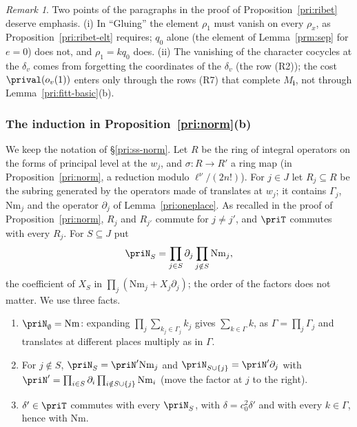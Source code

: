 \documentclass[10pt]{amsart}
\theoremstyle{definition}
\theoremstyle{remark}
\newtheorem{remark}[theorem]{Remark}
\begin{document}
\begin{remark}\label{prm:rem-chars}
Two points of the paragraphs in the proof of Proposition~\ref{pri:ribet} deserve emphasis. (i) In
``Gluing'' the element $\rho_1$ must vanish on every $\rho_x$, as Proposition~\ref{pri:ribet-elt}
requires; $q_0$ alone (the element of Lemma~\ref{prm:sep} for $e=0$) does not, and $\rho_1=kq_0$ does. (ii) The vanishing of the character cocycles at the
$\delta_v$ comes from forgetting the coordinates of the $\delta_v$ (the row (R2)); the cost
$\prival(o_v(1))$ enters only through the rows (R7) that complete $M_{\mathbf i}$, not through
Lemma~\ref{pri:fitt-basic}(b).
\end{remark}

\subsubsection{The induction in Proposition~\ref{pri:norm}(b)}\label{prm:ss-norm}

We keep the notation of \S\ref{pri:ss-norm}. Let $R$ be the ring of integral operators on the forms
of principal level at the $w_j$, and $\sigma\colon R\to R'$ a ring map (in Proposition~\ref{pri:norm},
a reduction modulo $\ell^\nu/(2n!)$). For $j\in J$ let $R_j\subseteq R$ be the subring generated by
the operators made of translates at $w_j$; it contains $\Gamma_j$, $\mathrm{Nm}_j$ and the operator
$\partial_j$ of Lemma~\ref{pri:oneplace}. As recalled in the proof of Proposition~\ref{pri:norm},
$R_j$ and $R_{j'}$ commute for $j\ne j'$, and $\priT$ commutes with every $R_j$. For $S\subseteq J$ put
\[
\priN_S=\prod_{j\in S}\partial_j\prod_{j\notin S}\mathrm{Nm}_j ,
\]
the coefficient of $X_S$ in $\prod_j(\mathrm{Nm}_j+X_j\partial_j)$; the order of the factors does not
matter. We use three facts.
\begin{enumerate}
\item[(N1)] $\priN_\emptyset=\mathrm{Nm}$: expanding $\prod_j\sum_{k_j\in\Gamma_j}k_j$ gives $\sum_{k\in
\Gamma}k$, as $\Gamma=\prod_j\Gamma_j$ and translates at different places multiply as in $\Gamma$.
\item[(N2)] For $j\notin S$, $\priN_S=\priN'\mathrm{Nm}_j$ and $\priN_{S\cup\{j\}}=\priN'\partial_j$ with
$\priN'=\prod_{i\in S}\partial_i\prod_{i\notin S\cup\{j\}}\mathrm{Nm}_i$ (move the factor at $j$ to the
right).
\item[(N3)] $\delta'\in\priT$ commutes with every $\priN_S$, with $\delta=c_0^2\delta'$ and with every
$k\in\Gamma$, hence with $\mathrm{Nm}$.
\end{enumerate}
\end{document}
